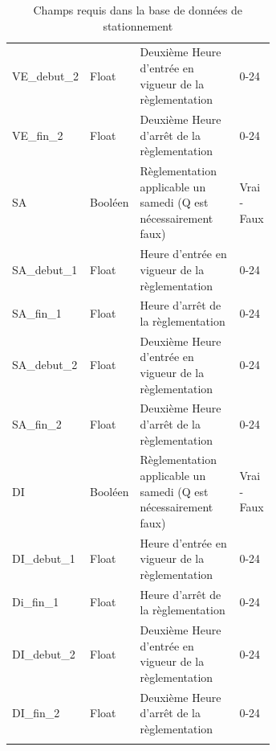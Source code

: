 \begin{longtable}{p{0.15 \linewidth}  l p{0.5\linewidth} l  }
    VE\_debut\_2 & Float & Deuxième Heure d'entrée en vigueur de la règlementation & 0-24\\
    VE\_fin\_2 & Float & Deuxième Heure d'arrêt de la règlementation & 0-24 \\
    SA & Booléen & Règlementation applicable un samedi (Q est nécessairement faux) & Vrai - Faux \\
    SA\_debut\_1 & Float & Heure d'entrée en vigueur de la règlementation & 0-24\\
    SA\_fin\_1 & Float & Heure d'arrêt de la règlementation & 0-24\\
    SA\_debut\_2 & Float & Deuxième Heure d'entrée en vigueur de la règlementation & 0-24\\
    SA\_fin\_2 & Float & Deuxième Heure d'arrêt de la règlementation & 0-24 \\
    DI & Booléen & Règlementation applicable un samedi (Q est nécessairement faux) & Vrai - Faux \\
    DI\_debut\_1 & Float & Heure d'entrée en vigueur de la règlementation & 0-24\\
    Di\_fin\_1 & Float & Heure d'arrêt de la règlementation & 0-24\\
    DI\_debut\_2 & Float & Deuxième Heure d'entrée en vigueur de la règlementation & 0-24\\
    DI\_fin\_2 & Float & Deuxième Heure d'arrêt de la règlementation & 0-24 \\
    
    \hline
   \caption{Champs requis dans la base de données de stationnement}
   \label{tab:donnees_requises}
  \end{longtable}
  \FloatBarrier

